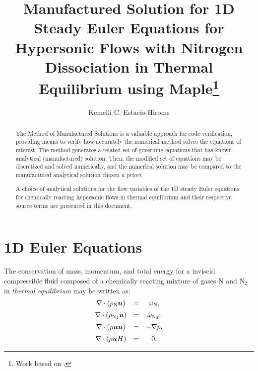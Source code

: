 \documentclass[10pt]{article}
\title{Manufactured Solution for 1D Steady Euler Equations for Hypersonic Flows with Nitrogen Dissociation in Thermal Equilibrium using Maple\footnote{Work based on \citet*{Roy2002,Kirk2009}.}}
\author{Kemelli C. Estacio-Hiroms}
\newcommand{\bv}[1]{\ensuremath{\mbox{\boldmath$ #1 $}}}
\begin{document}
\maketitle

\begin{abstract}
The Method of Manufactured Solutions is a valuable approach for code verification, providing means to verify how accurately the numerical method solves the equations of interest. The method generates a related set of governing equations that has known analytical (manufactured) solution. Then, the modified set of equations may be discretized and solved numerically, and the numerical solution may be compared to the manufactured analytical solution  chosen \textit{a priori}.

A choice of analytical solutions for the flow variables of the 1D steady Euler equations for chemically reacting hypersonic flows in thermal equilibrium  and their respective source terms are presented in this document.
\end{abstract}





\section{1D Euler Equations}
The conservation of mass, momentum, and total energy for a inviscid compressible fluid composed of a chemically reacting mixture of gases N and N$_2$ in \textit{thermal equilibrium} may be written as:
\begin{equation}
\label{eq:euler01}
\begin{array}{ccc}
\nabla \cdot \left(\rho_{\text{N}} \bv{u}\right) &=& \dot{\omega}_{\text{N}},\vspace{5pt} \\
\nabla \cdot \left(\rho_{\text{N}_2}\bv{u}\right) &=& \dot{\omega}_{\text{N}_2},\vspace{5pt} \\
\nabla\cdot\left(\rho\bv{u}\bv{u}\right) &=& -\nabla p,\vspace{5pt} \\
\nabla\cdot\left(\rho \bv{u} H\right) &=& 0.
\end{array}
\end{equation}
\end{document}
